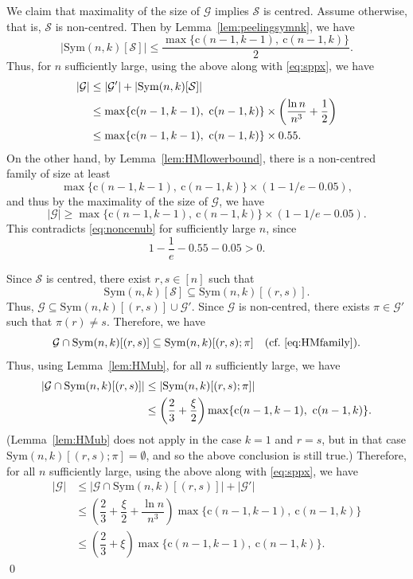 \documentclass{amsart}
\newcommand{\mcal}{\mathcal}
\newcommand{\sym}{\mathrm{Sym}}
\newcommand{\st}{\mathrm{c}}
\begin{document}
We claim that maximality of the size of $\mcal{G}$ implies $\mcal{S}$ is centred. Assume otherwise, that is, $\mcal{S}$ is non-centred. Then by Lemma~\ref{lem:peelingsymnk}, we have \[|\sym(n,k)[\mcal{S}]| \leq \dfrac{\max\{\st(n-1,k-1),\ \st(n-1,k)\}}{2}.\] Thus, for $n$ sufficiently large, using the above along with \eqref{eq:sppx}, we have 
\begin{align}\label{eq:noncenub}
|\mcal{G}| &\leq |\mcal{G}'|+|\sym(n,k)[\mcal{S}]|\notag \\
&\leq \max\{\st(n-1,k-1),\ \st(n-1,k)\} \times \left( \dfrac{\ln n}{n^{3}} + \dfrac{1}{2} \right) \notag \\
&\leq \max\{\st(n-1,k-1),\ \st(n-1,k)\} \times 0.55.
\end{align}
On the other hand, by Lemma~\ref{lem:HMlowerbound}, there is a non-centred family of size at least 
\[\max\{\st(n-1,k-1),\ \st(n-1,k)\} \times \left( 1-1/e - 0.05 \right),\] and thus by the maximality of the size of $\mcal{G}$, we have 
\[|\mcal{G}|\geq \max\{\st(n-1,k-1),\ \st(n-1,k)\} \times \left( 1-1/e -0.05 \right).\] 
This contradicts \eqref{eq:noncenub} for sufficiently large $n$, since
\[1-\dfrac{1}{e}-0.55-0.05>0.\]

Since $\mcal{S}$ is centred, there exist $r,s\in [n]$ such that \[\sym(n,k)[\mcal{S}] \subseteq \sym(n,k)[(r,s)].\] Thus, $\mcal{G} \subseteq \sym(n,k)[(r,s)] \cup \mcal{G}'$. Since $\mcal{G}$ is non-centred, there exists $\pi \in \mcal{G}'$ such that $\pi(r)\neq s$. Therefore, we have 
\[\mcal{G} \cap \sym(n,k)[(r,s)] \subseteq \sym(n,k)[(r,s);\pi]\quad (\text{cf.~\eqref{eq:HMfamily}}).\] 
Thus, using Lemma~\ref{lem:HMub}, for all $n$ sufficiently large, we have
\begin{align}\label{eq:general}
|\mcal{G} \cap \sym(n,k)[(r,s)]| &\leq |\sym(n,k)[(r,s);\pi]|\\
& \leq \left(\dfrac{2}{3} +\dfrac{\xi}{2} \right)\max\{\st(n-1,k-1),\ \st(n-1,k)\} \notag.
\end{align}
(Lemma~\ref{lem:HMub} does not apply in the case $k=1$ and $r=s$, but in that case $\sym(n,k)[(r,s);\pi]=\emptyset$, and so the above conclusion is still true.)
Therefore, for all $n$ sufficiently large, using the above along with \eqref{eq:sppx}, we have
\begin{align*}
|\mcal{G}| &\leq |\mcal{G} \cap \sym(n,k)[(r,s)]| + |\mcal{G}'| \\
&\leq \left(\dfrac{2}{3} +\dfrac{\xi}{2} +\dfrac{\ln n}{n^{3}}\right)\max\{\st(n-1,k-1),\ \st(n-1,k)\}\\
&\leq \left(\dfrac{2}{3} +\xi\right)\max\{\st(n-1,k-1),\ \st(n-1,k)\}.
\end{align*}
\qed
\end{document}

